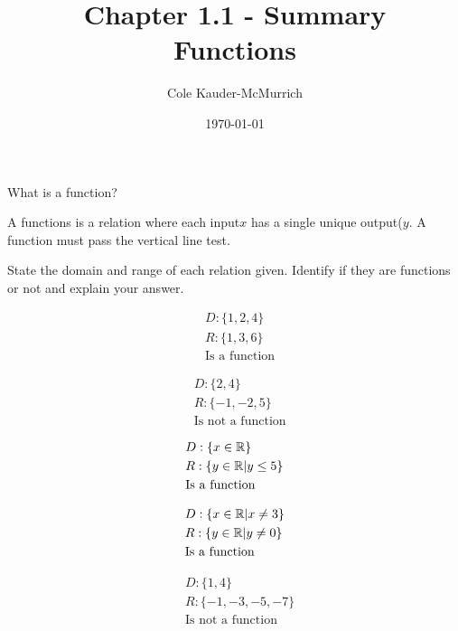 \documentclass{exam}
\title{\Huge{Chapter 1.1 - Summary}\\\huge{Functions}}
\author{Cole Kauder-McMurrich}
\date{\today}
\begin{document}
    \maketitle

\begin{questions}
    \question What is a function?

    A functions is a relation where each input\(x\) has a single unique output(\(y\). A function must pass the vertical line test.

    \question State the domain and range of each relation given. Identify if they are functions or not and explain your answer.

    \begin{answers}{3}
        \answer \[
            \begin{aligned}
                &D: \{1, 2, 4\}\\
                &R: \{1, 3, 6\}\\
                &\text{Is a function}
            \end{aligned} \]

        \answer \[
            \begin{aligned}
                &D: \{2, 4\}\\
                &R: \{-1, -2, 5\}\\
                &\text{Is not a function}
            \end{aligned} \]

        \answer \[
            \begin{aligned}
                &D: \{x \in \mathbb{R}\}\\
                &R: \{y \in \mathbb{R} | y \leq 5\}\\
                &\text{Is a function}
            \end{aligned} \]

        \answer \[
            \begin{aligned}
                &D: \{x \in \mathbb{R} | x \ne 3\}\\
                &R: \{y \in \mathbb{R} | y \ne 0\}\\
                &\text{Is a function}
            \end{aligned} \]

        \answer \[
            \begin{aligned}
                &D: \{1, 4\}\\
                &R: \{-1, -3, -5, -7\}\\
                &\text{Is not a function}
            \end{aligned} \]


\end{answers}
\end{questions}
\end{document}
